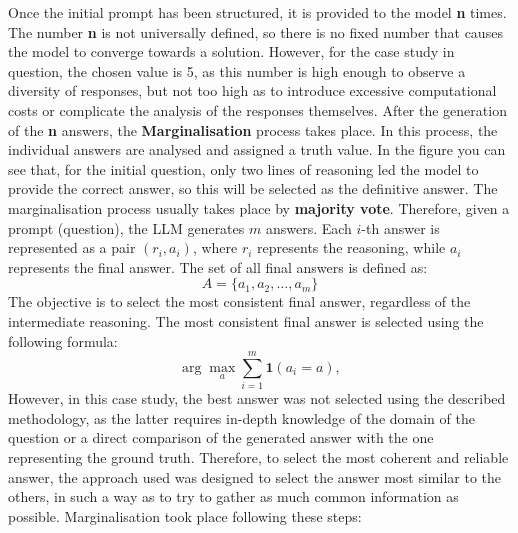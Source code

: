 Once the initial prompt has been structured, it is provided to the model \textbf{n} times.
The number \textbf{n} is not universally defined, so there is no fixed number that causes the model to converge towards a solution. However, for the case study in question, the chosen value is 5, as this number is high enough to observe a diversity of responses, but not too high as to introduce excessive computational costs or complicate the analysis of the responses themselves.
After the generation of the \textbf{n} answers, the \textbf{Marginalisation} process takes place. In this process, the individual answers are analysed and assigned a truth value. In the figure you can see that, for the initial question, only two lines of reasoning led the model to provide the correct answer, so this will be selected as the definitive answer. The marginalisation process usually takes place by \textbf{majority vote}.
Therefore, given a prompt (question), the LLM generates $m$ answers. Each $i$-th answer is represented as a pair $(r_i, a_i)$, where $r_i$ represents the reasoning, while $a_i$ represents the final answer. 
The set of all final answers is defined as:
\[
A = \{a_1, a_2, \dots, a_m\}
\]
The objective is to select the most consistent final answer, regardless of the intermediate reasoning. The most consistent final answer is selected using the following formula:
\[
\arg\max_a \sum_{i=1}^{m} \mathbf{1}(a_i = a),
\]
However, in this case study, the best answer was not selected using the described methodology, as the latter requires in-depth knowledge of the domain of the question or a direct comparison of the generated answer with the one representing the ground truth. Therefore, to select the most coherent and reliable answer, the approach used was designed to select the answer most similar to the others, in such a way as to try to gather as much common information as possible. Marginalisation took place following these steps:

